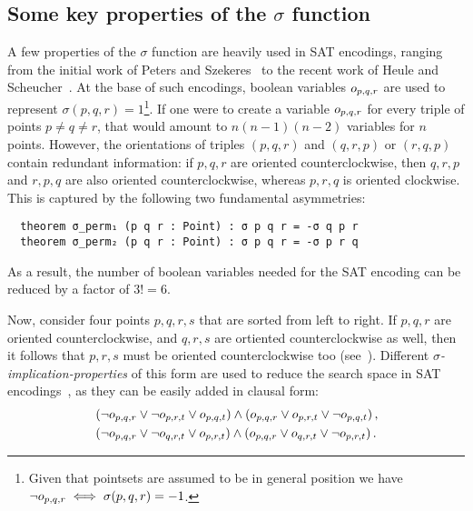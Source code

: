 \subsection{Some key properties of the $\sigma$ function}
A few properties of the $\sigma$ function are heavily used in SAT encodings, ranging from the initial work of Peters and Szekeres~\cite{szekeres_peters_2006} to the recent work of Heule and Scheucher~\cite{emptyHexagonNumber}. At the base of such encodings, boolean variables $\orvar_{p,q,r}$ are used to represent $\sigma(p, q, r) = 1$\footnote{Given that pointsets are assumed to be in general position we have $\neg \orvar_{p,q,r} \iff \sigma(p, q, r) = -1$.}. If one were to create a variable $\orvar_{p,q,r}$ for every triple of points $p \neq q \neq r$, that would amount to $n(n-1)(n-2)$ variables for $n$ points. However, the orientations of triples $(p, q, r)$ and $(q, r, p)$ or $(r, q, p)$ contain redundant information: if $p,q,r$ are oriented counterclockwise, then $q,r,p$ and $r,p,q$ are also oriented counterclockwise, whereas $p,r,q$ is oriented clockwise. This is captured by the following two fundamental asymmetries:
\begin{lstlisting}
  theorem σ_perm₁ (p q r : Point) : σ p q r = -σ q p r
  theorem σ_perm₂ (p q r : Point) : σ p q r = -σ p r q
\end{lstlisting}
As a result, the number of boolean variables needed for the SAT encoding can be reduced by a factor of $3! = 6$.

Now, consider four points $p, q, r, s$ that are sorted from left to right. If $p, q, r$ are oriented counterclockwise, and $q, r, s$ are ortiented counterclockwise as well, then it follows that $p, r, s$ must be oriented counterclockwise too (see~). Different \emph{$\sigma$-implication-properties} of this form are used to reduce the search space in SAT encodings~\cite{emptyHexagonNumber,scheucherTwoDisjoint5holes2020,subercaseaux2023minimizing, szekeres_peters_2006}, as they can be easily added in clausal form:
\begin{align}
  &\left(\neg \orvar_{p, q, r} \lor \neg \orvar_{p, r, t} \lor \orvar_{p, q, t}\right) \land \left(\orvar_{p, q, r} \lor \orvar_{p, r, t} \lor  \neg \orvar_{p, q, t}\right), \\ 
  &\left(\neg \orvar_{p, q, r} \lor \neg \orvar_{q, r, t} \lor  \orvar_{p, r, t}\right) \land \left(\orvar_{p, q, r} \lor \orvar_{q, r, t} \lor  \neg \orvar_{p, r, t}\right).
\end{align}

